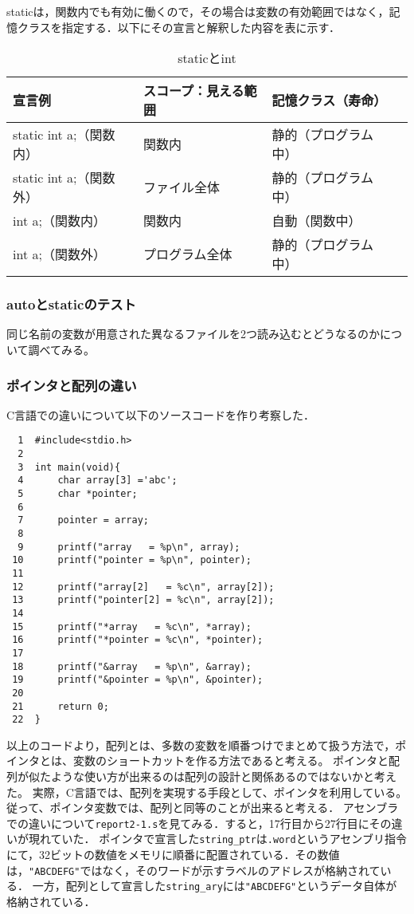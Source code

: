\documentclass[a4j,11pt]{jarticle}
\begin{document}
staticは，関数内でも有効に働くので，その場合は変数の有効範囲ではなく，記憶クラスを指定する．以下にその宣言と解釈した内容を表に示す．
\begin{table}[htb]
  \label{tab:table1}
  \centering
  \begin{tabular}{|l|l|l|l|}
  \hline
  宣言例                & スコープ：見える範囲 & 記憶クラス（寿命）  \\ \hline
  static int a;（関数内） & 関数内        & 静的（プログラム中） \\ \hline
  static int a;（関数外） & ファイル全体     & 静的（プログラム中） \\ \hline
  int a;（関数内）        & 関数内        & 自動（関数中）    \\ \hline
  int a;（関数外）        & プログラム全体    & 静的（プログラム中） \\ \hline
  \end{tabular}
  \caption{staticとint}
  \end{table}
\subsubsection{autoとstaticのテスト}
同じ名前の変数が用意された異なるファイルを2つ読み込むとどうなるのかについて調べてみる。

\subsubsection{ポインタと配列の違い}
C言語での違いについて以下のソースコードを作り考察した．
\begin{verbatim}
  1  #include<stdio.h>        
  2
  3  int main(void){
  4      char array[3] ='abc';
  5      char *pointer;
  6
  7      pointer = array;
  8
  9      printf("array   = %p\n", array);
 10      printf("pointer = %p\n", pointer);
 11
 12      printf("array[2]   = %c\n", array[2]);
 13      printf("pointer[2] = %c\n", array[2]);
 14
 15      printf("*array   = %c\n", *array);
 16      printf("*pointer = %c\n", *pointer);
 17
 18      printf("&array   = %p\n", &array);
 19      printf("&pointer = %p\n", &pointer);
 20
 21      return 0;
 22  }
\end{verbatim}
以上のコードより，配列とは、多数の変数を順番つけでまとめて扱う方法で，ポインタとは、変数のショートカットを作る方法であると考える。
ポインタと配列が似たような使い方が出来るのは配列の設計と関係あるのではないかと考えた。
実際，C言語では、配列を実現する手段として、ポインタを利用している。
従って、ポインタ変数では、配列と同等のことが出来ると考える．
アセンブラでの違いについて\verb|report2-1.s|を見てみる．すると，17行目から27行目にその違いが現れていた．
ポインタで宣言した\verb|string_ptr|は\verb|.word|というアセンブリ指令にて，32ビットの数値をメモリに順番に配置されている．その数値は，\verb|"ABCDEFG"|ではなく，そのワードが示すラベルのアドレスが格納されている．
一方，配列として宣言した\verb|string_ary|には\verb|"ABCDEFG"|というデータ自体が格納されている．
\end{document}
